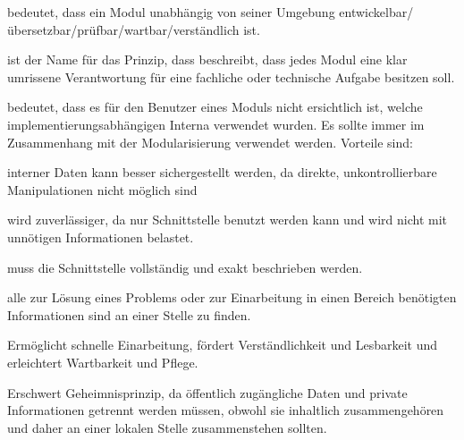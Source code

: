\documentclass[a4paper,fontsize=9pt, DIV=calc]{scrartcl}
\begin{document}
\begin{multicols}{2}
\begin{description}[leftmargin=*]
		\item[Kontextunabhängigkeit] bedeutet, dass ein Modul unabhängig von seiner Umgebung entwickelbar/übersetzbar/prüfbar/wartbar/verständlich ist.
		
		\item[Schnittstellenspezifikation] ist der Name für das Prinzip, dass beschreibt, dass jedes Modul eine klar umrissene Verantwortung für eine fachliche oder technische Aufgabe besitzen soll.
		
    \item[Geheimnisprinzip] bedeutet, dass es für den Benutzer eines Moduls nicht ersichtlich ist, welche implementierungsabhängigen Interna verwendet wurden. Es sollte immer im Zusammenhang mit der Modularisierung verwendet werden. Vorteile sind:
		\begin{description}[leftmargin=*]\itemsep-2mm
		\item[Datenkonsistenz] interner Daten kann besser sichergestellt werden, da direkte, unkontrollierbare Manipulationen nicht möglich sind
		\item[Benutzung einer Systemkomponente / eines Subsystems] wird zuverlässiger, da nur Schnittstelle benutzt werden kann und wird nicht mit unnötigen Informationen belastet.
		\item[Jedoch] muss die Schnittstelle vollständig und exakt beschrieben werden.
		\end{description}
		\item[Lokalisierung] alle zur Lösung eines Problems oder zur Einarbeitung in einen Bereich benötigten Informationen sind an einer Stelle zu finden.		
				\begin{description}[leftmargin=*]\itemsep-2mm
				\item[Vorteile] Ermöglicht schnelle Einarbeitung, fördert Verständlichkeit und Lesbarkeit und erleichtert Wartbarkeit und Pflege.
				\item[Nachteile] Erschwert Geheimnisprinzip, da öffentlich zugängliche Daten und private Informationen getrennt werden müssen, obwohl sie inhaltlich zusammengehören und daher an einer lokalen Stelle zusammenstehen sollten.
				\end{description}
\end{description}


\end{multicols}
\end{document}
